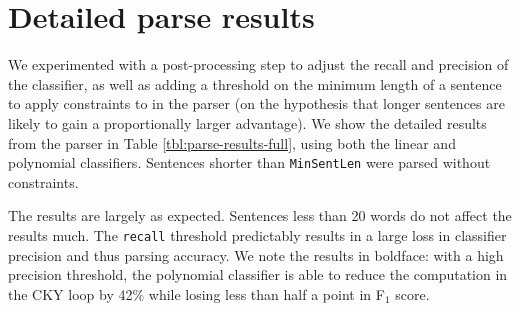 \documentclass[11pt]{article}
\begin{document}
\section{Detailed parse results}
\label{sec:parse-results-full}
\label{sec-8-2}

We experimented with a post-processing step to adjust the recall and precision of the classifier, as well as
adding a threshold on the minimum length of a sentence to apply constraints to in the parser (on the hypothesis
that longer sentences are likely to gain a proportionally larger advantage). We show the detailed results from
the parser in Table \ref{tbl:parse-results-full}, using both the linear and polynomial classifiers. Sentences
shorter than \texttt{MinSentLen} were parsed without constraints.

The results are largely as expected. Sentences less than 20 words do not affect the results much. The \texttt{recall} threshold
predictably results in a large loss in classifier precision and thus parsing accuracy. We note the results in
boldface: with a high precision threshold, the polynomial classifier is able to reduce the computation in the CKY loop
by 42\% while losing less than half a point in F$_{\text{1}}$ score.




\end{document}
